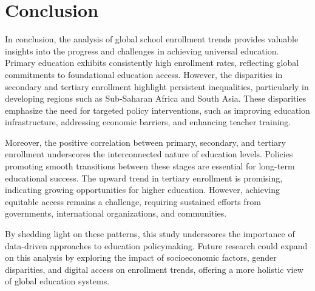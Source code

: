 \documentclass[
  letterpaper,
  DIV=11,
  numbers=noendperiod]{scrartcl}
\begin{document}
\section{Conclusion}\label{conclusion}

In conclusion, the analysis of global school enrollment trends provides
valuable insights into the progress and challenges in achieving
universal education. Primary education exhibits consistently high
enrollment rates, reflecting global commitments to foundational
education access. However, the disparities in secondary and tertiary
enrollment highlight persistent inequalities, particularly in developing
regions such as Sub-Saharan Africa and South Asia. These disparities
emphasize the need for targeted policy interventions, such as improving
education infrastructure, addressing economic barriers, and enhancing
teacher training.

Moreover, the positive correlation between primary, secondary, and
tertiary enrollment underscores the interconnected nature of education
levels. Policies promoting smooth transitions between these stages are
essential for long-term educational success. The upward trend in
tertiary enrollment is promising, indicating growing opportunities for
higher education. However, achieving equitable access remains a
challenge, requiring sustained efforts from governments, international
organizations, and communities.

By shedding light on these patterns, this study underscores the
importance of data-driven approaches to education policymaking. Future
research could expand on this analysis by exploring the impact of
socioeconomic factors, gender disparities, and digital access on
enrollment trends, offering a more holistic view of global education
systems.
\end{document}
